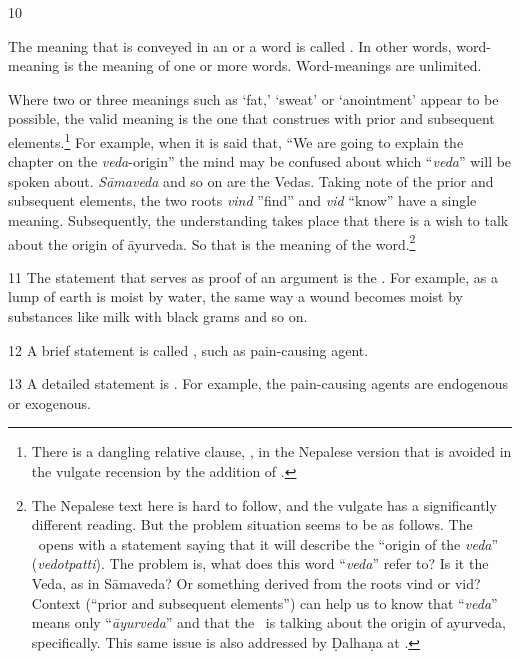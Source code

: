 \begin{translation}
\item [10] 

The meaning that is conveyed in an  or a word is 
called . In other words, word-meaning is the 
meaning of one or more words. Word-meanings are unlimited. 

Where two or three meanings such as `fat,’ `sweat’ or `anointment’ appear
to be possible, the valid meaning is the one that construes with prior
and subsequent elements.\footnote{There is a dangling relative clause,
    , in the Nepalese version that is avoided in the vulgate
    recension by the addition of .} For example, when it
    is said that, “We are going to explain the chapter on the
    \emph{veda}-origin” the mind may be confused about which “\emph{veda}”
    will be spoken about. \emph{Sāmaveda} and so on are the Vedas. Taking
    note of the prior and subsequent elements, the two roots \emph{vind}
    ”find” and \emph{vid} “know” have a single meaning. Subsequently, the
    understanding takes place that there is a wish to talk about the origin
    of āyurveda.  So that is the meaning of the word.\footnote{The Nepalese
        text here is hard to follow, and the vulgate has a significantly
        different reading. But the problem situation seems to be as follows.  The
        \SS\ opens with a statement saying that it will describe the “origin of
        the \emph{veda}” (\emph{vedotpatti}).  The problem is, what does this
        word “\emph{veda}” refer to?  Is it the Veda, as in Sāmaveda?  Or
        something derived from the roots \root vind or \root vid?  Context
        (“prior and subsequent elements”) can help us to know that “\emph{veda}”
        means only “\emph{āyurveda}” and that the \SS\ is talking about the
        origin of ayurveda, specifically.  This same issue is also addressed by 
        Ḍalhaṇa at .}

\item [11] The statement that serves as proof of an argument is the 
. For example, as a lump of earth is moist by water, the 
same way a wound becomes moist by substances like milk with black grams and 
so on.  

\item [12] A brief statement is called , such as 
 {pain-causing agent}. 

\item [13] A detailed statement is . For example, the 
pain-causing agents are endogenous or exogenous. 


\end{translation}
